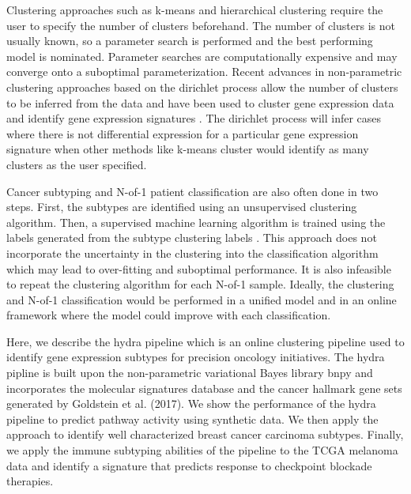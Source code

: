 \documentclass[fleqn,10pt]{wlscirep}
\begin{document}
Clustering approaches such as k-means and hierarchical clustering require the user to specify the number of clusters beforehand. The number of clusters is not usually known, so a parameter search is performed and the best performing model is nominated. Parameter searches are computationally expensive and may converge onto a suboptimal parameterization. Recent advances in non-parametric clustering approaches based on the dirichlet process allow the number of clusters to be inferred from the data and have been used to cluster gene expression data and identify gene expression signatures \cite{medvedovic2002bayesian,newton2004detecting,zhao2014bayesian}. The dirichlet process will infer cases where there is not differential expression for a particular gene expression signature when other methods like k-means cluster would identify as many clusters as the user specified. 

Cancer subtyping and N-of-1 patient classification are also often done in two steps. First, the subtypes are identified using an unsupervised clustering algorithm. Then, a supervised machine learning algorithm is trained using the labels generated from the subtype clustering labels \cite{zhao2018molecular}. This approach does not incorporate the uncertainty in the clustering into the classification algorithm which may lead to over-fitting and suboptimal performance. It is also infeasible to repeat the clustering algorithm for each N-of-1 sample. Ideally, the clustering and N-of-1 classification would be performed in a unified model and in an online framework where the model could improve with each classification.

Here, we describe the hydra pipeline which is an online clustering pipeline used to identify gene expression subtypes for precision oncology initiatives. The hydra pipline is built upon the non-parametric variational Bayes library bnpy \cite{hughes2014bnpy} and incorporates the molecular signatures database \cite{liberzon2011molecular} and the cancer hallmark gene sets generated by Goldstein et al. (2017). We show the performance of the hydra pipeline to predict pathway activity using synthetic data. We then apply the approach to identify well characterized breast cancer carcinoma subtypes. Finally, we apply the immune subtyping abilities of the pipeline to the TCGA melanoma data and identify a signature that predicts response to checkpoint blockade therapies.

\end{document}
